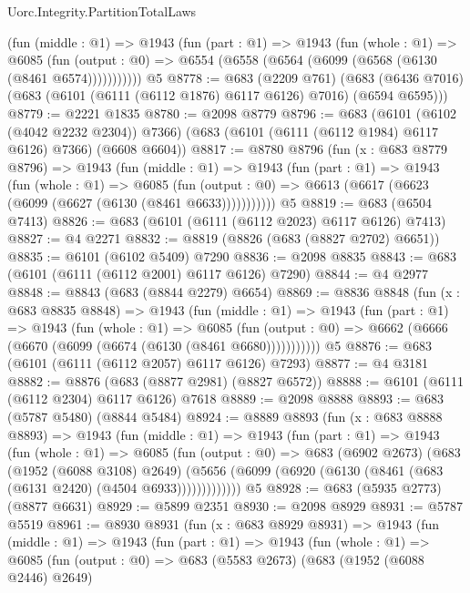 \begin{lexlean}{Uorc.Integrity.PartitionTotalLaws}
\begin{coremodule}
      (fun (middle : @1) =>
      @1943
        (fun (part : @1) =>
        @1943
          (fun (whole : @1) =>
          @6085
            (fun (output : @0) => @6554 (@6558 (@6564 (@6099 (@6568 (@6130 (@8461 @6574)))))))))))
    @5
@8778 := @683
    (@2209 @761)
    (@683 (@6436 @7016) (@683 (@6101 (@6111 (@6112 @1876) @6117 @6126) @7016) (@6594 @6595)))
@8779 := @2221 @1835
@8780 := @2098 @8779
@8796 := @683
    (@6101 (@6102 (@4042 @2232 @2304)) @7366)
    (@683 (@6101 (@6111 (@6112 @1984) @6117 @6126) @7366) (@6608 @6604))
@8817 := @8780
    @8796
    (fun (x : @683 @8779 @8796) =>
    @1943
      (fun (middle : @1) =>
      @1943
        (fun (part : @1) =>
        @1943
          (fun (whole : @1) =>
          @6085
            (fun (output : @0) => @6613 (@6617 (@6623 (@6099 (@6627 (@6130 (@8461 @6633)))))))))))
    @5
@8819 := @683 (@6504 @7413)
@8826 := @683 (@6101 (@6111 (@6112 @2023) @6117 @6126) @7413)
@8827 := @4 @2271
@8832 := @8819 (@8826 (@683 (@8827 @2702) @6651))
@8835 := @6101 (@6102 @5409) @7290
@8836 := @2098 @8835
@8843 := @683 (@6101 (@6111 (@6112 @2001) @6117 @6126) @7290)
@8844 := @4 @2977
@8848 := @8843 (@683 (@8844 @2279) @6654)
@8869 := @8836
    @8848
    (fun (x : @683 @8835 @8848) =>
    @1943
      (fun (middle : @1) =>
      @1943
        (fun (part : @1) =>
        @1943
          (fun (whole : @1) =>
          @6085
            (fun (output : @0) => @6662 (@6666 (@6670 (@6099 (@6674 (@6130 (@8461 @6680)))))))))))
    @5
@8876 := @683 (@6101 (@6111 (@6112 @2057) @6117 @6126) @7293)
@8877 := @4 @3181
@8882 := @8876 (@683 (@8877 @2981) (@8827 @6572))
@8888 := @6101 (@6111 (@6112 @2304) @6117 @6126) @7618
@8889 := @2098 @8888
@8893 := @683 (@5787 @5480) (@8844 @5484)
@8924 := @8889
    @8893
    (fun (x : @683 @8888 @8893) =>
    @1943
      (fun (middle : @1) =>
      @1943
        (fun (part : @1) =>
        @1943
          (fun (whole : @1) =>
          @6085
            (fun (output : @0) =>
            @683
              (@6902 @2673)
              (@683
                (@1952 (@6088 @3108) @2649)
                (@5656 (@6099 (@6920 (@6130 (@8461 (@683 (@6131 @2420) (@4504 @6933)))))))))))))
    @5
@8928 := @683 (@5935 @2773) (@8877 @6631)
@8929 := @5899 @2351
@8930 := @2098 @8929
@8931 := @5787 @5519
@8961 := @8930
    @8931
    (fun (x : @683 @8929 @8931) =>
    @1943
      (fun (middle : @1) =>
      @1943
        (fun (part : @1) =>
        @1943
          (fun (whole : @1) =>
          @6085
            (fun (output : @0) =>
            @683
              (@5583 @2673)
              (@683
                (@1952 (@6088 @2446) @2649)

\end{coremodule}
\end{lexlean}
